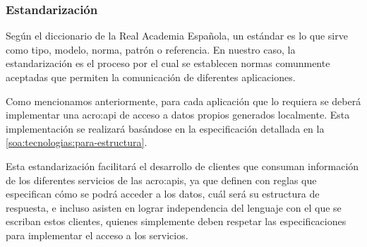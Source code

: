 \subsubsection{Estandarización}

Según el diccionario de la Real Academia Española, un estándar es lo que sirve como tipo, modelo, norma, patrón o referencia. En nuestro caso, la estandarización es el proceso por el cual se establecen normas comunmente aceptadas que permiten la comunicación de diferentes aplicaciones.

Como mencionamos anteriormente, para cada aplicación que lo requiera se deberá implementar una \gls{acro:api} de acceso a datos propios generados localmente. Esta implementación se realizará basándose en la especificación  detallada en la \autoref{soa:tecnologias:para-estructura}.

Esta estandarización facilitará el desarrollo de clientes que consuman información de los diferentes servicios de las \glspl{acro:api}, ya que definen con reglas que especifican cómo se podrá acceder a los datos, cuál será su estructura de respuesta, e incluso asisten en lograr independencia del lenguaje con el que se escriban estos clientes, quienes simplemente deben respetar las especificaciones para implementar el acceso a los servicios.
